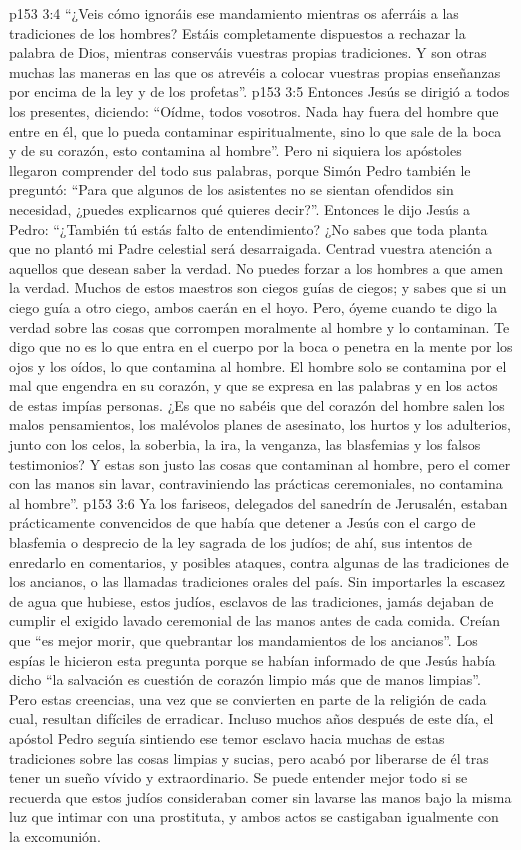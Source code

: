 \vs p153 3:4 “¿Veis cómo ignoráis ese mandamiento mientras os aferráis a las tradiciones de los hombres? Estáis completamente dispuestos a rechazar la palabra de Dios, mientras conserváis vuestras propias tradiciones. Y son otras muchas las maneras en las que os atrevéis a colocar vuestras propias enseñanzas por encima de la ley y de los profetas”.
\vs p153 3:5 Entonces Jesús se dirigió a todos los presentes, diciendo: “Oídme, todos vosotros. Nada hay fuera del hombre que entre en él, que lo pueda contaminar espiritualmente, sino lo que sale de la boca y de su corazón, esto contamina al hombre”. Pero ni siquiera los apóstoles llegaron comprender del todo sus palabras, porque Simón Pedro también le preguntó: “Para que algunos de los asistentes no se sientan ofendidos sin necesidad, ¿puedes explicarnos qué quieres decir?”. Entonces le dijo Jesús a Pedro: “¿También tú estás falto de entendimiento? ¿No sabes que toda planta que no plantó mi Padre celestial será desarraigada. Centrad vuestra atención a aquellos que desean saber la verdad. No puedes forzar a los hombres a que amen la verdad. Muchos de estos maestros son ciegos guías de ciegos; y sabes que si un ciego guía a otro ciego, ambos caerán en el hoyo. Pero, óyeme cuando te digo la verdad sobre las cosas que corrompen moralmente al hombre y lo contaminan. Te digo que no es lo que entra en el cuerpo por la boca o penetra en la mente por los ojos y los oídos, lo que contamina al hombre. El hombre solo se contamina por el mal que engendra en su corazón, y que se expresa en las palabras y en los actos de estas impías personas. ¿Es que no sabéis que del corazón del hombre salen los malos pensamientos, los malévolos planes de asesinato, los hurtos y los adulterios, junto con los celos, la soberbia, la ira, la venganza, las blasfemias y los falsos testimonios? Y estas son justo las cosas que contaminan al hombre, pero el comer con las manos sin lavar, contraviniendo las prácticas ceremoniales, no contamina al hombre”.
\vs p153 3:6 Ya los fariseos, delegados del sanedrín de Jerusalén, estaban prácticamente convencidos de que había que detener a Jesús con el cargo de blasfemia o desprecio de la ley sagrada de los judíos; de ahí, sus intentos de enredarlo en comentarios, y posibles ataques, contra algunas de las tradiciones de los ancianos, o las llamadas tradiciones orales del país. Sin importarles la escasez de agua que hubiese, estos judíos, esclavos de las tradiciones, jamás dejaban de cumplir el exigido lavado ceremonial de las manos antes de cada comida. Creían que “es mejor morir, que quebrantar los mandamientos de los ancianos”. Los espías le hicieron esta pregunta porque se habían informado de que Jesús había dicho “la salvación es cuestión de corazón limpio más que de manos limpias”. Pero estas creencias, una vez que se convierten en parte de la religión de cada cual, resultan difíciles de erradicar. Incluso muchos años después de este día, el apóstol Pedro seguía sintiendo ese temor esclavo hacia muchas de estas tradiciones sobre las cosas limpias y sucias, pero acabó por liberarse de él tras tener un sueño vívido y extraordinario. Se puede entender mejor todo si se recuerda que estos judíos consideraban comer sin lavarse las manos bajo la misma luz que intimar con una prostituta, y ambos actos se castigaban igualmente con la excomunión.
